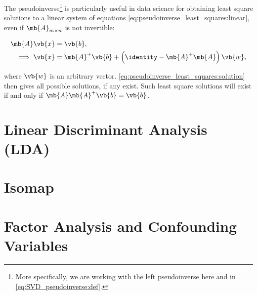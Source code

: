 The pseudoinverse\footnote{More specifically, we are working with the left pseudoinverse here and in \cref{eq:SVD_pseudoinverse:def}.} is
particularly useful in data science
for obtaining least square solutions to a linear system of equations \cref{eq:pseudoinverse_least_squares:linear},
even if $\mb{A}_{m \times n}$ is not invertible:

\begin{subequations}\label{eq:pseudoinverse_least_squares}
\begin{align}
\mb{A} \vb{x} &= \vb{b}, \label{eq:pseudoinverse_least_squares:linear} \\
\implies \vb{x} &= \mb{A}^{+} \vb{b} + \left(\identity - \mb{A}^{+}\mb{A}\right) \vb{w}, \label{eq:pseudoinverse_least_squares:solution}
\end{align}
\end{subequations}

\noindent where $\vb{w}$ is an arbitrary vector.
\cref{eq:pseudoinverse_least_squares:solution} then gives all possible solutions, if any exist.
Such least square solutions will exist if and only if $\mb{A} \mb{A}^{+} \vb{b} = \vb{b}$.

\section{Linear Discriminant Analysis (LDA)}
\label{dim_reduct:LDA}


\section{Isomap}
\label{dim_reduct:isomap}

\section{Factor Analysis and Confounding Variables}
\label{dim_reduct:factor_ana}

